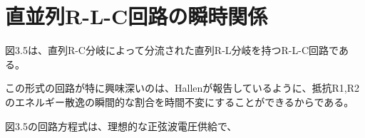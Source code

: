 \documentclass[fleqn,11pt,a4paper,dvipdfmx]{jsarticle}
\begin{document}
%
%
\section{直並列R-L-C回路の瞬時関係}


図3.5は、直列R-C分岐によって分流された直列R-L分岐を持つR-L-C回路である。

この形式の回路が特に興味深いのは、Hallenが報告しているように、抵抗R1,R2のエネルギー散逸の瞬間的な割合を時間不変にすることができるからである。

図3.5の回路方程式は、理想的な正弦波電圧供給で、


\newpage


%
%
\end{document}

